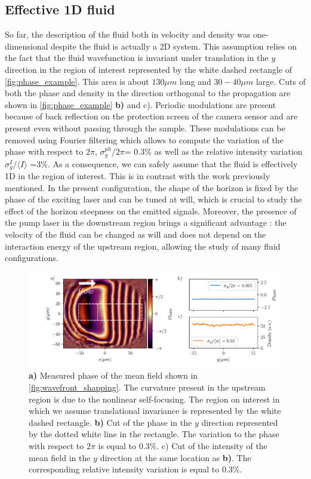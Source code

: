 \subsection{Effective 1D fluid}

So far, the description of the fluid both in velocity and density was one-dimensional despite the fluid is actually a 2D system. This assumption
relies on the fact that the fluid wavefunction is invariant under translation in the $y$ direction in the  region of interest represented by the white dashed rectangle of \autoref{fig:phase_example}. This area is about $130 \mu m$ long and $30-40 \mu m $ large. 
Cuts of both the phase and density in the direction orthogonal to the propagation are shown in \autoref{fig:phase_example} \textbf{b)} and c). Periodic modulations are present because of back reflection on the protection screen of the camera sensor and are present even without passing through the sample. These modulations can be removed
using Fourier filtering which allows to compute the variation of the phase with respect to $2\pi$,  $\sigma_y^{ph}/2\pi$= 0.3\% as well as the relative intensity variation $\sigma_y^I/\langle I \rangle$ =3\%. As a consequence,
we can safely assume that the fluid is effectively 1D in the region of interest. This is in contrast with the work \cite{nguyen_acoustic_2015} previously mentioned. In the present configuration, the shape of the horizon is fixed by the phase of the exciting laser and can be tuned at will, which is crucial to
study the effect of the horizon steepness on the emitted signals. Moreover, the presence of the pump laser in the downstream region brings a significant advantage : the velocity of the fluid can be changed as will and does not depend on the interaction energy of the upstream region, allowing the study of many fluid configurations.


\begin{figure}[h]
    \centering
    \includegraphics[width=1\textwidth]{chap_custom_st/fig/phase_example.pdf}
    \caption{\textbf{a)} Measured phase of the mean field shown in \autoref{fig:wavefront_shapping}. The curvature present in the upstream region is due to the nonlinear self-focusing. The region
    on interest in which we assume translational invariance is represented by the white dashed rectangle. \textbf{b)}  Cut of the phase in the $y$ direction represented by the dotted white line in the rectangle. The variation to the phase with respect
    to $2\pi$ is equal to 0.3\%. c) Cut of the intensity of the mean field in the $y$ direction at the same location as \textbf{b)}. The corresponding relative intensity variation is equal to 0.3\%.}
    \label{fig:phase_example}
\end{figure}

